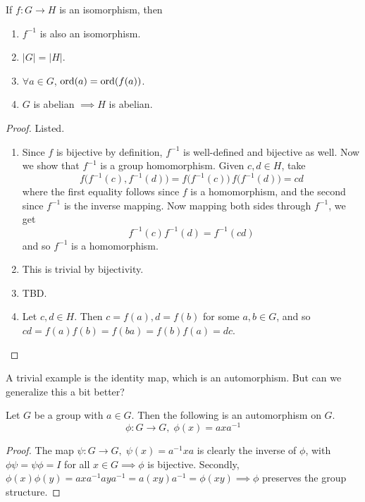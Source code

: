   \begin{theorem}
    If $f: G \rightarrow H$ is an isomorphism, then 
    \begin{enumerate}
      \item $f^{-1}$ is also an isomorphism. 
      \item $|G| = |H|$.
      \item $\forall a \in G$, $\ord(a) = \ord(f(a))$. 
      \item $G$ is abelian $\implies H$ is abelian. 
    \end{enumerate} 
  \end{theorem}
  \begin{proof}
    Listed. 
    \begin{enumerate}
      \item Since $f$ is bijective by definition, $f^{-1}$ is well-defined and bijective as well. Now we show that $f^{-1}$ is a group homomorphism. Given $c, d \in H$, take 
      \begin{equation}
        f \big( f^{-1} (c), f^{-1} (d)\big) = f \big( f^{-1} (c) \big) \, f \big( f^{-1} (d) \big) = cd 
      \end{equation}
      where the first equality follows since $f$ is a homomorphism, and the second since $f^{-1}$ is the inverse mapping. Now mapping both sides through $f^{-1}$, we get 
      \begin{equation}
        f^{-1} (c) f^{-1} (d) = f^{-1} (cd)
      \end{equation}
      and so $f^{-1}$ is a homomorphism. 

      \item This is trivial by bijectivity. 
      \item TBD. 
      \item Let $c, d \in H$. Then $c = f(a), d = f(b)$ for some $a, b \in G$, and so $cd = f(a) f(b) = f(ba) = f(b) f(a) = dc$. 
    \end{enumerate}
  \end{proof}

  A trivial example is the identity map, which is an automorphism. But can we generalize this a bit better? 

  \begin{theorem}
    Let $G$ be a group with $a \in G$. Then the following is an automorphism on $G$. 
    \begin{equation}
      \phi: G \longrightarrow G, \; \phi (x) = a x a^{-1}
    \end{equation}
  \end{theorem}
  \begin{proof}
    The map $\psi: G \longrightarrow G, \; \psi(x) = a^{-1} x a$ is clearly the inverse of $\phi$, with $\phi \psi = \psi \phi = I$ for all $x \in G \implies \phi$ is bijective. Secondly, $\phi(x) \phi(y) = a x a^{-1} a y a^{-1} = a (x y) a ^{-1} = \phi (x y) \implies \phi$ preserves the group structure. 
  \end{proof} 

